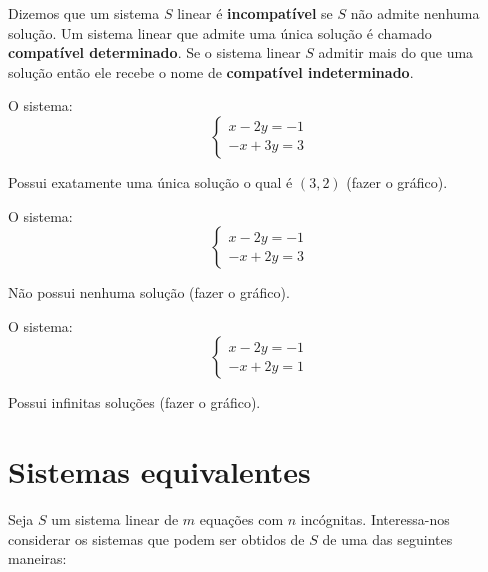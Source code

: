 \begin{df}
	Dizemos que um sistema $S$ linear é \textbf{incompatível} se $S$ não admite nenhuma solução. Um sistema linear que admite uma única solução é chamado \textbf{compatível determinado}. Se o sistema linear $S$ admitir mais do que uma solução então ele recebe o nome de \textbf{compatível indeterminado}. 	
\end{df}
\begin{ex}
	O sistema:\\
	\begin{equation*}
	\begin{cases}
	x-2y=-1 \\
	-x+3y=3
	\end{cases}
	\end{equation*} 
\end{ex}
Possui exatamente uma única solução o qual é  $(3,2)$ (fazer o gráfico).
\begin{ex}
	O sistema:\\
	\begin{equation*}
	\begin{cases}
	x-2y=-1 \\
	-x+2y=3
	\end{cases}
	\end{equation*} 
\end{ex}
Não possui nenhuma solução (fazer o gráfico).
\begin{ex}
	O sistema:\\
	\begin{equation*}
	\begin{cases}
	x-2y=-1 \\
	-x+2y=1
	\end{cases}
	\end{equation*} 
\end{ex}
Possui infinitas soluções (fazer o gráfico).
\newpage
\section{Sistemas equivalentes}
Seja $S$ um sistema linear de $m$ equações com $n$ incógnitas. Interessa-nos considerar os sistemas que podem ser obtidos de $S$ de uma das seguintes maneiras:

